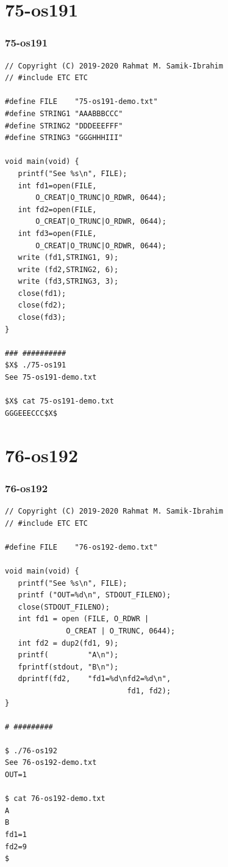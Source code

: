 \documentclass[xcolor=table, notheorems, hyperref={pdfpagelabels=false}]{beamer}
\begin{document}
\section{75-os191}
\begin{frame}[fragile]
\frametitle{75-os191}
\begin{lstlisting}[basicstyle=\ttfamily\tiny]
// Copyright (C) 2019-2020 Rahmat M. Samik-Ibrahim
// #include ETC ETC

#define FILE    "75-os191-demo.txt"
#define STRING1 "AAABBBCCC"
#define STRING2 "DDDEEEFFF"
#define STRING3 "GGGHHHIII"

void main(void) {
   printf("See %s\n", FILE);
   int fd1=open(FILE, 
       O_CREAT|O_TRUNC|O_RDWR, 0644);
   int fd2=open(FILE, 
       O_CREAT|O_TRUNC|O_RDWR, 0644);
   int fd3=open(FILE, 
       O_CREAT|O_TRUNC|O_RDWR, 0644);
   write (fd1,STRING1, 9);
   write (fd2,STRING2, 6);
   write (fd3,STRING3, 3);
   close(fd1);
   close(fd2);
   close(fd3);
}

### ##########
$X$ ./75-os191 
See 75-os191-demo.txt

$X$ cat 75-os191-demo.txt 
GGGEEECCC$X$

\end{lstlisting}
\end{frame}

\section{76-os192}
\begin{frame}[fragile]
\frametitle{76-os192}
\begin{lstlisting}[basicstyle=\ttfamily\tiny]
// Copyright (C) 2019-2020 Rahmat M. Samik-Ibrahim
// #include ETC ETC

#define FILE    "76-os192-demo.txt"

void main(void) {
   printf("See %s\n", FILE);
   printf ("OUT=%d\n", STDOUT_FILENO);
   close(STDOUT_FILENO);
   int fd1 = open (FILE, O_RDWR | 
              O_CREAT | O_TRUNC, 0644);
   int fd2 = dup2(fd1, 9);
   printf(         "A\n"); 
   fprintf(stdout, "B\n"); 
   dprintf(fd2,    "fd1=%d\nfd2=%d\n", 
                            fd1, fd2);
}

# #########

$ ./76-os192 
See 76-os192-demo.txt
OUT=1

$ cat 76-os192-demo.txt 
A
B
fd1=1
fd2=9
$ 

\end{lstlisting}
\end{frame}
\end{document}
